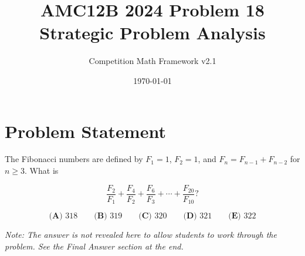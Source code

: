 \documentclass[12pt]{article}
\begin{document}
\title{AMC12B 2024 Problem 18\\Strategic Problem Analysis}
\author{Competition Math Framework v2.1}
\date{\today}
\maketitle

\section*{Problem Statement}

The Fibonacci numbers are defined by $F_1 = 1$, $F_2 = 1$, and $F_n = F_{n-1} + F_{n-2}$ for $n \geq 3$. What is

$$\frac{F_2}{F_1} + \frac{F_4}{F_2} + \frac{F_6}{F_3} + \cdots + \frac{F_{20}}{F_{10}}?$$

$$\textbf{(A) } 318 \qquad\textbf{(B) } 319 \qquad\textbf{(C) } 320 \qquad\textbf{(D) } 321 \qquad\textbf{(E) } 322$$

\vspace{0.3cm}
\noindent\textit{Note: The answer is not revealed here to allow students to work through the problem. See the Final Answer section at the end.}
\end{document}
